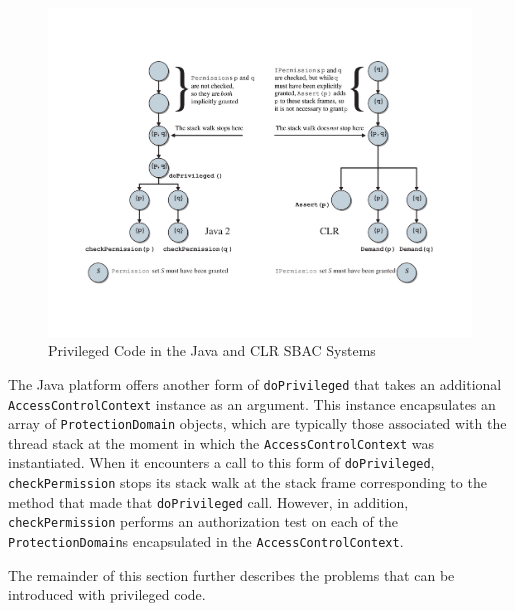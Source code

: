 \begin{figure}[ht]
	\centering
	\includegraphics[scale=0.4]{privilegedcode-eps-converted-to.pdf}
	\caption{Privileged Code in the Java and CLR SBAC Systems}
	\label{fig:privilegedcode}
\end{figure}

The Java platform offers another form of \texttt{doPrivileged}
that takes an additional \texttt{AccessControlContext} instance as
an argument.  This instance encapsulates an array of
\texttt{ProtectionDomain} objects, which are typically those
associated with the thread stack at the moment in which the
\texttt{AccessControlContext} was instantiated. When it encounters
a call to this form of \texttt{doPrivileged},
\texttt{checkPermission} stops its stack walk at the stack frame
corresponding to the method that made that \texttt{doPrivileged}
call. However, in addition, \texttt{checkPermission} performs an
authorization test on each of the \texttt{ProtectionDomain}s
encapsulated in the \texttt{AccessControlContext}.

The remainder of this section further describes the problems that
can be introduced with privileged code.

